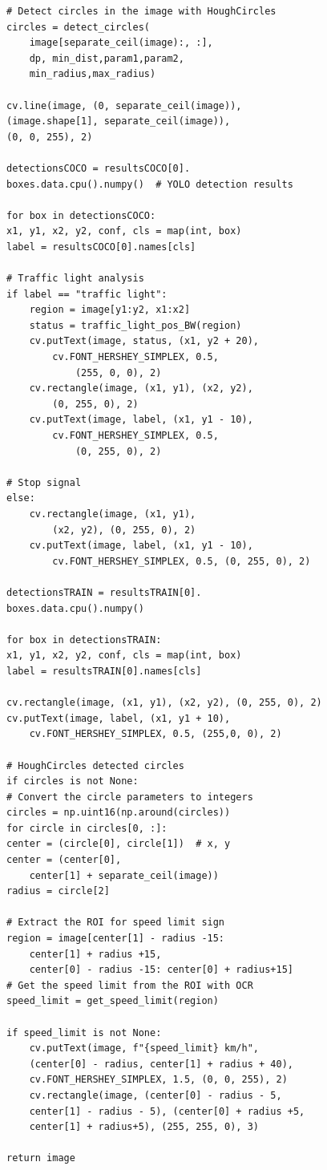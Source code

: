 \documentclass[10pt,conference,a4paper]{IEEEtran}
\begin{document}
\begin{appendices}
\begin{verbatim}
# Detect circles in the image with HoughCircles
circles = detect_circles(
    image[separate_ceil(image):, :],
    dp, min_dist,param1,param2,
    min_radius,max_radius)

cv.line(image, (0, separate_ceil(image)), 
(image.shape[1], separate_ceil(image)), 
(0, 0, 255), 2)

detectionsCOCO = resultsCOCO[0].
boxes.data.cpu().numpy()  # YOLO detection results

for box in detectionsCOCO:
x1, y1, x2, y2, conf, cls = map(int, box)
label = resultsCOCO[0].names[cls]

# Traffic light analysis
if label == "traffic light":
    region = image[y1:y2, x1:x2]
    status = traffic_light_pos_BW(region)
    cv.putText(image, status, (x1, y2 + 20), 
        cv.FONT_HERSHEY_SIMPLEX, 0.5, 
            (255, 0, 0), 2)
    cv.rectangle(image, (x1, y1), (x2, y2), 
        (0, 255, 0), 2)
    cv.putText(image, label, (x1, y1 - 10), 
        cv.FONT_HERSHEY_SIMPLEX, 0.5, 
            (0, 255, 0), 2)

# Stop signal
else:
    cv.rectangle(image, (x1, y1), 
        (x2, y2), (0, 255, 0), 2)
    cv.putText(image, label, (x1, y1 - 10), 
        cv.FONT_HERSHEY_SIMPLEX, 0.5, (0, 255, 0), 2)

detectionsTRAIN = resultsTRAIN[0].
boxes.data.cpu().numpy()

for box in detectionsTRAIN:
x1, y1, x2, y2, conf, cls = map(int, box)
label = resultsTRAIN[0].names[cls]

cv.rectangle(image, (x1, y1), (x2, y2), (0, 255, 0), 2)
cv.putText(image, label, (x1, y1 + 10), 
    cv.FONT_HERSHEY_SIMPLEX, 0.5, (255,0, 0), 2)

# HoughCircles detected circles
if circles is not None:
# Convert the circle parameters to integers
circles = np.uint16(np.around(circles))
for circle in circles[0, :]:
center = (circle[0], circle[1])  # x, y
center = (center[0], 
    center[1] + separate_ceil(image))
radius = circle[2]

# Extract the ROI for speed limit sign
region = image[center[1] - radius -15: 
    center[1] + radius +15, 
    center[0] - radius -15: center[0] + radius+15]
# Get the speed limit from the ROI with OCR
speed_limit = get_speed_limit(region)

if speed_limit is not None:
    cv.putText(image, f"{speed_limit} km/h", 
    (center[0] - radius, center[1] + radius + 40),
    cv.FONT_HERSHEY_SIMPLEX, 1.5, (0, 0, 255), 2)
    cv.rectangle(image, (center[0] - radius - 5, 
    center[1] - radius - 5), (center[0] + radius +5, 
    center[1] + radius+5), (255, 255, 0), 3)

return image
\end{verbatim}
\label{lst:main}
\end{appendices}
\end{document}
